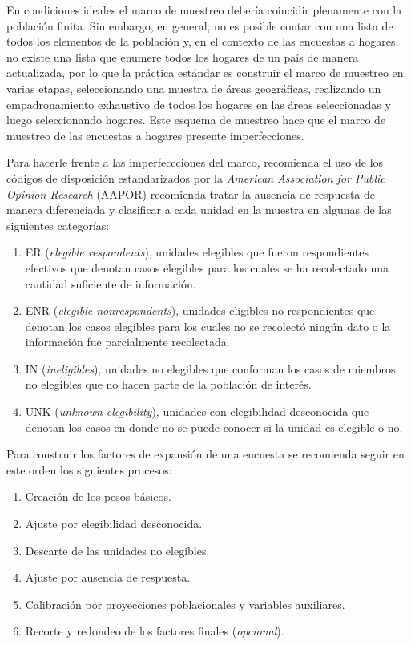 \documentclass[
  12pt,
]{book}
\providecommand{\tightlist}{%
  \setlength{\itemsep}{0pt}\setlength{\parskip}{0pt}}
\begin{document}
En condiciones ideales el marco de muestreo debería coincidir plenamente con la población finita. Sin embargo, en general, no es posible contar con una lista de todos los elementos de la población y, en el contexto de las encuestas a hogares, no existe una lista que enumere todos los hogares de un país de manera actualizada, por lo que la práctica estándar es construir el marco de muestreo en varias etapas, seleccionando una muestra de áreas geográficas, realizando un empadronamiento exhaustivo de todos los hogares en las áreas seleccionadas y luego seleccionando hogares. Este esquema de muestreo hace que el marco de muestreo de las encuestas a hogares presente imperfecciones.

Para hacerle frente a las imperfeccciones del marco, \citet{Valliant_Dever_2017} recomienda el uso de los códigos de disposición estandarizados por la \emph{American Association for Public Opinion Research} (AAPOR) recomienda tratar la ausencia de respuesta de manera diferenciada y clasificar a cada unidad en la muestra en algunas de las siguientes categorías:

\begin{enumerate}
\def\labelenumi{\arabic{enumi}.}
\tightlist
\item
  ER (\emph{elegible respondents}), unidades elegibles que fueron respondientes efectivos que denotan casos elegibles para los cuales se ha recolectado una cantidad suficiente de información.
\item
  ENR (\emph{elegible nonrespondents}), unidades eligibles no respondientes que denotan los casos elegibles para los cuales no se recolectó ningún dato o la información fue parcialmente recolectada.
\item
  IN (\emph{ineligibles}), unidades no elegibles que conforman los casos de miembros no elegibles que no hacen parte de la población de interés.
\item
  UNK (\emph{unknown elegibility}), unidades con elegibilidad desconocida que denotan los casos en donde no se puede conocer si la unidad es elegible o no.
\end{enumerate}

Para construir los factores de expansión de una encuesta se recomienda seguir en este orden los siguientes procesos:

\begin{enumerate}
\def\labelenumi{\arabic{enumi}.}
\tightlist
\item
  Creación de los pesos básicos.
\item
  Ajuste por elegibilidad desconocida.
\item
  Descarte de las unidades no elegibles.
\item
  Ajuste por ausencia de respuesta.
\item
  Calibración por proyecciones poblacionales y variables auxiliares.
\item
  Recorte y redondeo de los factores finales (\emph{opcional}).
\end{enumerate}
\end{document}
